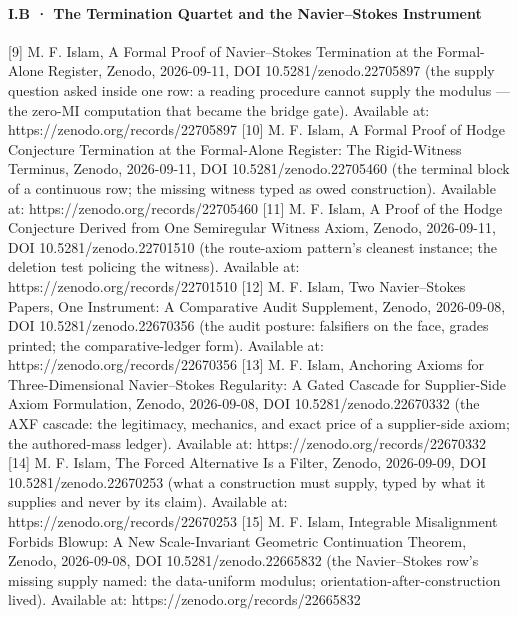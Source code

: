 \documentclass[10pt]{article}
\renewcommand{\_}{\origunderscore\allowbreak}
\begin{document}
\hypertarget{i.b-the-termination-quartet-and-the-navierstokes-instrument}{%
\paragraph{I.B · The Termination Quartet and the Navier--Stokes
Instrument}\label{i.b-the-termination-quartet-and-the-navierstokes-instrument}}

{[}9{]} M. F. Islam, A Formal Proof of Navier--Stokes Termination at the
Formal-Alone Register, Zenodo, 2026-09-11, DOI 10.5281/zenodo.22705897
(the supply question asked inside one row: a reading procedure cannot
supply the modulus --- the zero-MI computation that became the bridge
gate). Available at: https://zenodo.org/records/22705897 {[}10{]} M. F.
Islam, A Formal Proof of Hodge Conjecture Termination at the
Formal-Alone Register: The Rigid-Witness Terminus, Zenodo, 2026-09-11,
DOI 10.5281/zenodo.22705460 (the terminal block of a continuous row; the
missing witness typed as owed construction). Available at:
https://zenodo.org/records/22705460 {[}11{]} M. F. Islam, A Proof of the
Hodge Conjecture Derived from One Semiregular Witness Axiom, Zenodo,
2026-09-11, DOI 10.5281/zenodo.22701510 (the route-axiom pattern's
cleanest instance; the deletion test policing the witness). Available
at: https://zenodo.org/records/22701510 {[}12{]} M. F. Islam, Two
Navier--Stokes Papers, One Instrument: A Comparative Audit Supplement,
Zenodo, 2026-09-08, DOI 10.5281/zenodo.22670356 (the audit posture:
falsifiers on the face, grades printed; the comparative-ledger form).
Available at: https://zenodo.org/records/22670356 {[}13{]} M. F. Islam,
Anchoring Axioms for Three-Dimensional Navier--Stokes Regularity: A
Gated Cascade for Supplier-Side Axiom Formulation, Zenodo, 2026-09-08,
DOI 10.5281/zenodo.22670332 (the AXF cascade: the legitimacy, mechanics,
and exact price of a supplier-side axiom; the authored-mass ledger).
Available at: https://zenodo.org/records/22670332 {[}14{]} M. F. Islam,
The Forced Alternative Is a Filter, Zenodo, 2026-09-09, DOI
10.5281/zenodo.22670253 (what a construction must supply, typed by what
it supplies and never by its claim). Available at:
https://zenodo.org/records/22670253 {[}15{]} M. F. Islam, Integrable
Misalignment Forbids Blowup: A New Scale-Invariant Geometric
Continuation Theorem, Zenodo, 2026-09-08, DOI 10.5281/zenodo.22665832
(the Navier--Stokes row's missing supply named: the data-uniform
modulus; orientation-after-construction lived). Available at:
https://zenodo.org/records/22665832
\end{document}
